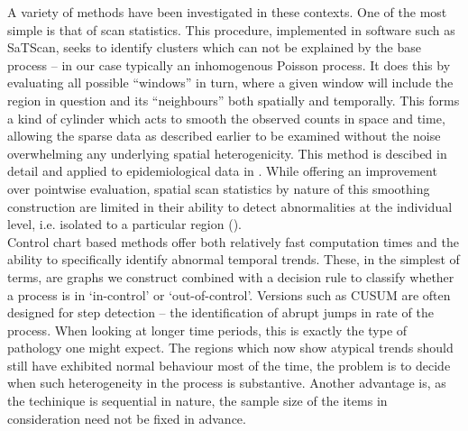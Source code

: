 \documentclass{report}
\begin{document}
A variety of methods have been investigated in these contexts. One of the most simple is that of scan statistics. This procedure, implemented in software such as SaTScan, seeks to identify clusters which can not be explained by the base process -- in our case typically an inhomogenous Poisson process. It does this by evaluating all possible ``windows'' in turn, where a given window will include the region in question and its ``neighbours'' both spatially and temporally. This forms a kind of cylinder which acts to smooth the observed counts in space and time, allowing the sparse data as described earlier to be examined without the noise overwhelming any underlying spatial heterogenicity. This method is descibed in detail and applied to epidemiological data in \cite{scan}. While offering an improvement over pointwise evaluation, spatial scan statistics by nature of this smoothing construction are limited in their ability to detect abnormalities at the individual level, i.e. isolated to a particular region (\cite{baystdetect}).  \\

Control chart based methods offer both relatively fast computation times and the ability to specifically identify abnormal temporal trends. These, in the simplest of terms, are graphs we construct combined with a decision rule to classify whether a process is in `in-control' or `out-of-control'. Versions such as CUSUM are often designed for step detection -- the identification of abrupt jumps in rate of the process. When looking at longer time periods, this is exactly the type of pathology one might expect. The regions which now show atypical trends should still have exhibited normal behaviour most of the time, the problem is to decide when such heterogeneity in the process is substantive.  Another advantage is, as the techinique is sequential in nature, the sample size of the items in consideration need not be fixed in advance.  \\
\end{document}
